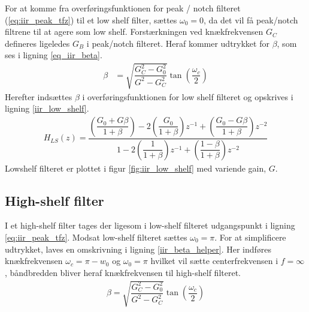 	For at komme fra overføringsfunktionen for peak / notch filteret (\ref{eq:iir_peak_tfz}) til et low shelf filter, sættes $\omega_0 = 0$, da det vil få peak/notch filtrene til at agere som low shelf. 
	Forstærkningen ved knækfrekvensen $G_C$ defineres ligeledes $G_B$ i peak/notch filteret.
    Heraf kommer udtrykket for $\beta$, som ses i ligning \ref{eq_iir_beta}.
    \begin{align}
        \beta &= \sqrt{\dfrac{G_C^2 - G_0^2}{G^2 - G_C^2}} \tan \left( \dfrac{\omega_c}{2} \right) \label{eq_iir_beta}
    \end{align}
	Herefter indsættes $\beta$ i overføringsfunktionen for low shelf filteret og opskrives i ligning \ref{iir_low_shelf}.
     \begin{align}
      H_{LS}(z) =  \dfrac{\left(\dfrac{G_0 + G \beta}{1 + \beta} \right)- 2 \left(\dfrac{G_0 }{1 +\beta} \right)z^{-1} + \left(\dfrac{ G_0 - G \beta}{1 + \beta }\right) z^{-2}}{1 - 2 \left(\dfrac{1}{1 + \beta}\right)z^{-1} + \left( \dfrac{1 - \beta}{1 + \beta} \right) z^{-2}} \label{iir_low_shelf}
     \end{align}
	Lowshelf filteret er plottet i figur \ref{fig:iir_low_shelf} med variende gain, $G$.
   
   
     \subsection{High-shelf filter}
	I et high-shelf filter tages der ligesom i low-shelf filteret udgangspunkt i ligning \ref{eq:iir_peak_tfz}. Modsat low-shelf filteret sættes $\omega_0 = \pi$.
     For at simplificere udtrykket, laves en omskrivning i ligning \ref{iir_beta_helper}. Her indføres knækfrekvensen $\omega_c = \pi - w_0$ og $\omega_0 = \pi$ hvilket vil sætte centerfrekvensen i $f = \infty$, båndbredden bliver heraf knækfrekvensen til high-shelf filteret.
    \begin{align}
        \beta = \sqrt{\dfrac{G_C^2 - G_0^2}{G^2 - G_C^2}} \tan \left( \dfrac{\omega_c}{2} \right) \label{iir_beta_helper}
    \end{align}



